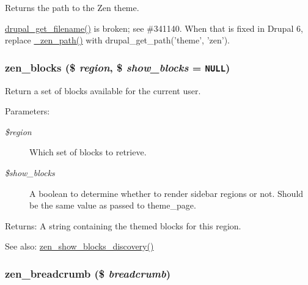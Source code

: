 Returns the path to the Zen theme.

\hyperlink{bootstrap_8inc_e2af73b6b16cc9d723e931748aa6c853}{drupal\_\-get\_\-filename()} is broken; see \#341140. When that is fixed in Drupal 6, replace \hyperlink{sites_2all_2themes_2zen_2template_8php_18a0c8640a660d394193e10081bdaa31}{\_\-zen\_\-path()} with drupal\_\-get\_\-path('theme', 'zen'). \hypertarget{sites_2all_2themes_2zen_2template_8php_5d93a4bc56049bf6962fa956bc54d274}{
\subsubsection[{zen\_\-blocks}]{\setlength{\rightskip}{0pt plus 5cm}zen\_\-blocks (\$ {\em region}, \/  \$ {\em show\_\-blocks} = {\tt NULL})}}
\label{sites_2all_2themes_2zen_2template_8php_5d93a4bc56049bf6962fa956bc54d274}


Return a set of blocks available for the current user.

\begin{Desc}
\item[Parameters:]
\begin{description}
\item[{\em \$region}]Which set of blocks to retrieve. \item[{\em \$show\_\-blocks}]A boolean to determine whether to render sidebar regions or not. Should be the same value as passed to theme\_\-page. \end{description}
\end{Desc}
\begin{Desc}
\item[Returns:]A string containing the themed blocks for this region.\end{Desc}
\begin{Desc}
\item[See also:]\hyperlink{sites_2all_2themes_2zen_2template_8php_73caa65f5d569efce36a732c0775f3e6}{zen\_\-show\_\-blocks\_\-discovery()} \end{Desc}
\hypertarget{sites_2all_2themes_2zen_2template_8php_52d978469f9a39a0a2c89585f81cf5cd}{
\subsubsection[{zen\_\-breadcrumb}]{\setlength{\rightskip}{0pt plus 5cm}zen\_\-breadcrumb (\$ {\em breadcrumb})}}
\label{sites_2all_2themes_2zen_2template_8php_52d978469f9a39a0a2c89585f81cf5cd}


